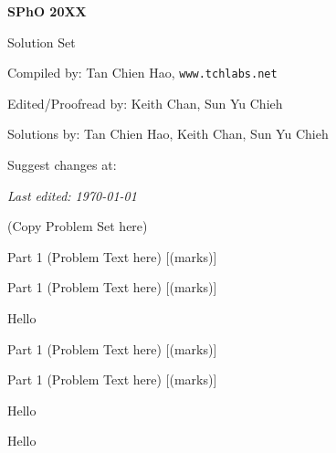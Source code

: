\def\sphoyear{20XX}
\setcounter{section}{0}
\setcounter{solcounter}{0}

\fancyhead[L]{\textbf{SPhO \sphoyear}} 


\begin{titlepage}
\centering

{\Huge\bfseries SPhO \sphoyear}

\vspace{1cm}

{\LARGE Solution Set}

\vspace{2cm}

{\Large Compiled by: Tan Chien Hao, \texttt{www.tchlabs.net}}

\vspace{2cm}

{\Large Edited/Proofread by: Keith Chan, Sun Yu Chieh}

\vspace{2cm}

{\Large Solutions by: Tan Chien Hao, Keith Chan, Sun Yu Chieh}

\vspace{2cm}

{\large Suggest changes at: \github}


\vfill

{\itshape Last edited: \today}
\end{titlepage}

(Copy Problem Set here)

\begin{problem}
    \lipsum[2]
    \begin{subproblem}
    Part 1 (Problem Text here)
    \hfill [(marks)]\end{subproblem}
    \begin{subproblem}
    Part 1 (Problem Text here)
    \hfill [(marks)]\end{subproblem}
\end{problem}

\begin{solution}
    Hello
\end{solution}
\begin{problem}
    \lipsum[2]
    \begin{subproblem}
    Part 1 (Problem Text here)
    \hfill [(marks)]\end{subproblem}
    \begin{subproblem}
    Part 1 (Problem Text here)
    \hfill [(marks)]\end{subproblem}
\end{problem}
\begin{solution}
    \begin{subsolution}
        Hello
    \end{subsolution}
    \tcblower
    \begin{subsolution}
        Hello
    \end{subsolution}
\end{solution}